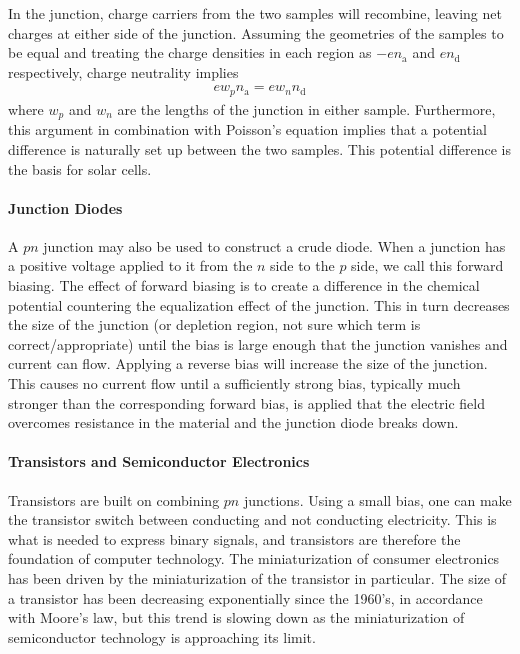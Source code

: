 In the junction, charge carriers from the two samples will recombine, leaving net charges at either side of the junction. Assuming the geometries of the samples to be equal and treating the charge densities in each region as $-en_{\text{a}}$ and $en_{\text{d}}$ respectively, charge neutrality implies
\begin{align*}
	ew_{p}n_{\text{a}} = ew_{n}n_{\text{d}}
\end{align*}
where $w_{p}$ and $w_{n}$ are the lengths of the junction in either sample. Furthermore, this argument in combination with Poisson's equation implies that a potential difference is naturally set up between the two samples. This potential difference is the basis for solar cells.

\paragraph{Junction Diodes}
A $pn$ junction may also be used to construct a crude diode. When a junction has a positive voltage applied to it from the $n$ side to the $p$ side, we call this forward biasing. The effect of forward biasing is to create a difference in the chemical potential countering the equalization effect of the junction. This in turn decreases the size of the junction (or depletion region, not sure which term is correct/appropriate) until the bias is large enough that the junction vanishes and current can flow. Applying a reverse bias will increase the size of the junction. This causes no current flow until a sufficiently strong bias, typically much stronger than the corresponding forward bias, is applied that the electric field overcomes resistance in the material and the junction diode breaks down.

\paragraph{Transistors and Semiconductor Electronics}
Transistors are built on combining $pn$ junctions. Using a small bias, one can make the transistor switch between conducting and not conducting electricity. This is what is needed to express binary signals, and transistors are therefore the foundation of computer technology. The miniaturization of consumer electronics has been driven by the miniaturization of the transistor in particular. The size of a transistor has been decreasing exponentially since the 1960's, in accordance with Moore's law, but this trend is slowing down as the miniaturization of semiconductor technology is approaching its limit.